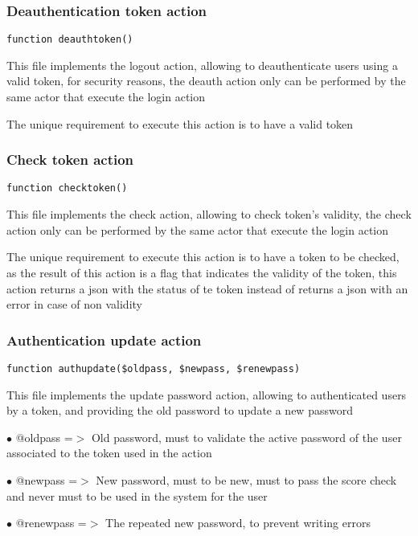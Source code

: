 \documentclass[a4paper]{article}
\begin{document}
\hypertarget{toc376}{}
\subsubsection{Deauthentication token action}

\begin{lstlisting}
function deauthtoken()
\end{lstlisting}

This file implements the logout action, allowing to deauthenticate users
using a valid token, for security reasons, the deauth action only can
be performed by the same actor that execute the login action

The unique requirement to execute this action is to have a valid token

\hypertarget{toc377}{}
\subsubsection{Check token action}

\begin{lstlisting}
function checktoken()
\end{lstlisting}

This file implements the check action, allowing to check token's validity, the check
action only can be performed by the same actor that execute the login action

The unique requirement to execute this action is to have a token to be checked, as the
result of this action is a flag that indicates the validity of the token, this action
returns a json with the status of te token instead of returns a json with an error in
case of non validity

\hypertarget{toc378}{}
\subsubsection{Authentication update action}

\begin{lstlisting}
function authupdate($oldpass, $newpass, $renewpass)
\end{lstlisting}

This file implements the update password action, allowing to authenticated
users by a token, and providing the old password to update a new password

\begin{compactitem}
\item[\color{myblue}$\bullet$] @oldpass   =$>$ Old password, must to validate the active password of the user
              associated to the token used in the action
\item[\color{myblue}$\bullet$] @newpass   =$>$ New password, must to be new, must to pass the score check and
              never must to be used in the system for the user
\item[\color{myblue}$\bullet$] @renewpass =$>$ The repeated new password, to prevent writing errors
\end{compactitem}
\end{document}
